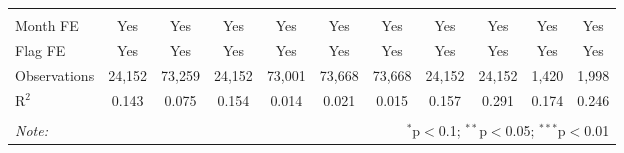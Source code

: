 \begin{table}[H]
\begin{tabular}{@{\extracolsep{1pt}}lcccccccccc}
  & & & & & & & & & & \\ 
\hline \\[-1.8ex] 
Month FE & Yes & Yes & Yes & Yes & Yes & Yes & Yes & Yes & Yes & Yes \\ 
Flag FE & Yes & Yes & Yes & Yes & Yes & Yes & Yes & Yes & Yes & Yes \\ 
Observations & 24,152 & 73,259 & 24,152 & 73,001 & 73,668 & 73,668 & 24,152 & 24,152 & 1,420 & 1,998 \\ 
R$^{2}$ & 0.143 & 0.075 & 0.154 & 0.014 & 0.021 & 0.015 & 0.157 & 0.291 & 0.174 & 0.246 \\ 
\hline 
\hline \\[-1.8ex] 
\textit{Note:}  & \multicolumn{10}{r}{$^{*}$p$<$0.1; $^{**}$p$<$0.05; $^{***}$p$<$0.01} \\ 
\end{tabular} 
\end{table} 
